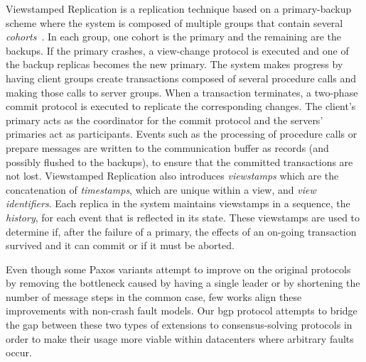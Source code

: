 Viewstamped Replication is a replication technique based on a primary-backup scheme where the system is composed of multiple groups that contain several \textit{cohorts}~\cite{Oki:1988}. In each group, one cohort is the primary and the remaining are the backups. If the primary crashes, a view-change protocol is executed and one of the backup replicas becomes the new primary. The system makes progress by having client groups create transactions composed of several procedure calls and making those calls to server groups. When a transaction terminates, a two-phase commit protocol is executed to replicate the corresponding changes. The client's primary acts as the coordinator for the commit protocol and the servers' primaries act as participants. Events such as the processing of procedure calls or prepare messages are written to the communication buffer as records (and possibly flushed to the backups), to ensure that the committed transactions are not lost. Viewstamped Replication also introduces \textit{viewstamps} which are the concatenation of \textit{timestamps}, which are unique within a view, and \textit{view identifiers}. Each replica in the system maintains viewstamps in a sequence, the \textit{history}, for each event that is reflected in its state. These viewstamps are used to determine if, after the failure of a primary, the effects of an on-going transaction survived and it can commit or if it must be aborted. \par
Even though some Paxos variants attempt to improve on the original protocols by removing the bottleneck caused by having a single leader or by shortening the number of message steps in the common case, few works align these improvements with non-crash fault models. Our \acrlong{bgp} protocol attempts to bridge the gap between these two types of extensions to consensus-solving protocols in order to make their usage more viable within datacenters where arbitrary faults occur.

